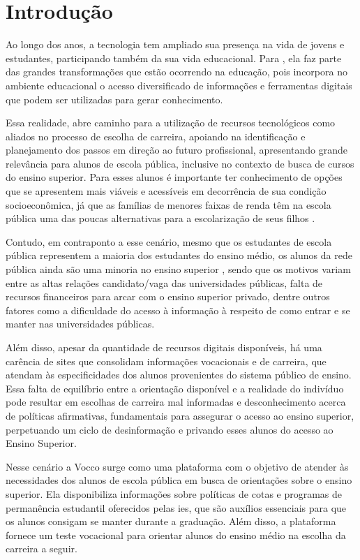 \chapter{Introdução}
Ao longo dos anos, a tecnologia tem ampliado sua presença na vida de jovens e estudantes, participando também da sua vida educacional. Para \cite{alves2022tecnologia}, ela faz parte das grandes transformações que estão ocorrendo na educação, pois incorpora no ambiente educacional o acesso diversificado de informações e ferramentas digitais que podem ser utilizadas para gerar conhecimento. 

Essa realidade, abre caminho para a utilização de recursos tecnológicos como aliados no processo de escolha de carreira, apoiando na identificação e planejamento dos passos em direção ao futuro profissional, apresentando grande relevância para alunos de escola pública, inclusive no contexto de busca de cursos do ensino superior. Para esses alunos é importante ter conhecimento de opções que se apresentem mais viáveis e acessíveis em decorrência de sua condição socioeconômica, já que as famílias de menores faixas de renda têm na escola pública uma das poucas alternativas para a escolarização de seus filhos \cite{matos2012impacto}.

Contudo, em contraponto a esse cenário, mesmo que os estudantes de escola pública representem a maioria dos estudantes do ensino médio, os alunos da rede pública ainda são uma minoria no ensino superior \cite{alvarenga2012desafios}, sendo que os motivos variam entre as altas relações candidato/vaga das universidades públicas, falta de recursos financeiros para arcar com o ensino superior privado, dentre outros fatores como a dificuldade do acesso à informação à respeito de como entrar e se manter nas universidades públicas.

Além disso, apesar da quantidade de recursos digitais disponíveis, há uma carência de sites que consolidam informações vocacionais e de carreira, que atendam às especificidades dos alunos provenientes do sistema público de ensino. Essa falta de equilíbrio entre a orientação disponível e a realidade do indivíduo pode resultar em escolhas de carreira mal informadas e desconhecimento acerca de políticas afirmativas, fundamentais para assegurar o acesso ao ensino superior, perpetuando um ciclo de desinformação e  privando esses alunos do acesso ao Ensino Superior.

Nesse cenário a Vocco surge como uma plataforma com o objetivo de atender às necessidades dos alunos de escola pública em busca de orientações sobre o ensino superior. Ela disponibiliza informações sobre políticas de cotas e programas de permanência estudantil oferecidos pelas \ac{ies}, que são auxílios essenciais para que os alunos consigam se manter durante a graduação. Além disso, a plataforma fornece um teste vocacional para orientar alunos do ensino médio na escolha da carreira a seguir.




% 
% 
% 

